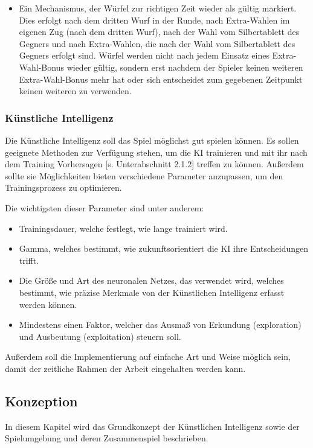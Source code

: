 \begin{itemize}
\item Ein Mechanismus, der Würfel zur richtigen Zeit wieder als gültig markiert. Dies erfolgt nach dem dritten Wurf in der Runde, nach Extra-Wahlen im eigenen Zug (nach dem dritten Wurf), nach der Wahl vom Silbertablett des Gegners und nach Extra-Wahlen, die nach der Wahl vom Silbertablett des Gegners erfolgt sind. Würfel werden nicht nach jedem Einsatz eines Extra-Wahl-Bonus wieder gültig, sondern erst nachdem der Spieler keinen weiteren Extra-Wahl-Bonus mehr hat oder sich entscheidet zum gegebenen Zeitpunkt keinen weiteren zu verwenden.
\end{itemize}

\newpage
\subsubsection{Künstliche Intelligenz}
Die Künstliche Intelligenz soll das Spiel möglichst gut spielen können. Es sollen geeignete Methoden zur Verfügung stehen, um die KI trainieren und mit ihr nach dem Training Vorhersagen [s. Unterabschnitt 2.1.2] treffen zu können. Außerdem sollte sie Möglichkeiten bieten verschiedene Parameter anzupassen, um den Trainingsprozess zu optimieren.

Die wichtigsten dieser Parameter sind unter anderem:
\begin{itemize} 
\item Trainingsdauer, welche festlegt, wie lange trainiert wird.
\item Gamma, welches bestimmt, wie zukunftsorientiert die KI ihre Entscheidungen trifft. 
\item Die Größe und Art des neuronalen Netzes, das verwendet wird, welches bestimmt, wie präzise Merkmale von der Künstlichen Intelligenz erfasst werden können.
\item Mindestens einen Faktor, welcher das Ausmaß von Erkundung (exploration) und Ausbeutung (exploitation) steuern soll. 
\end{itemize}
Außerdem soll die Implementierung auf einfache Art und Weise möglich sein, damit der zeitliche Rahmen der Arbeit eingehalten werden kann.

\newpage
\subsection{Konzeption}
In diesem Kapitel wird das Grundkonzept der Künstlichen Intelligenz sowie der Spielumgebung und deren Zusammenspiel beschrieben.\\

